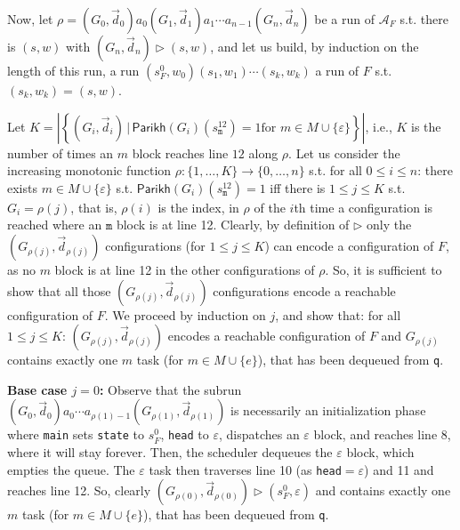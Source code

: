 \documentclass[runningheads,oribibl,]{article}
\newcommand{\set}[2]{\left\{#1\,\vert\,#2\right\}}
\newcommand{\Aa}{\ensuremath{\mathcal{A}}\xspace}
\newcommand{\e}{\ensuremath{\varepsilon}\xspace}
\newcommand{\Graph}{\ensuremath{G}}
\newcommand{\Data}{\ensuremath{\vec{d}}}
\newcommand{\Parikh}{\ensuremath{\mathsf{Parikh}}}
\newcommand{\mystate}[2]{\ensuremath{s^{#1}_{\mathtt{#2}}}}
\newenvironment{proof}{\noindent{\it Proof.\hspace*{.5cm}}}{}
\begin{document}
\begin{proof}
  Now, let $\rho=(\Graph_0,\Data_0)a_0(\Graph_1,\Data_1)a_1\cdots a_{n-1}
  (\Graph_n,\Data_n)$ be a run of $\Aa_F$ s.t. there is $(s,w)$ with
  $(\Graph_n,\Data_n)\rhd(s,w)$, and let us build, by induction on the
  length of this run, a run $(s^0_F,w_0)(s_1,w_1)\cdots(s_k,w_k)$ a
  run of $F$ s.t. $(s_k,w_k)=(s,w)$.

  Let
  $K=|\set{(\Graph_i,\Data_i)}{\Parikh(\Graph_i)(\mystate{12}{m})=1\textrm{
      for }m\in M\cup\{\e\}}|$, i.e., $K$ is the number of times an
  $m$ block reaches line $12$ along $\rho$. Let us consider the
  increasing monotonic function
  $\rho:\{1,\ldots,K\}\rightarrow\{0,\ldots,n\}$ s.t. for all $0\leq
  i\leq n$: there exists $m\in M\cup\{\e\}$
  s.t. $\Parikh(\Graph_i)(\mystate{12}{m})=1$ iff there is $1\leq
  j\leq K$ s.t. $\Graph_i=\rho(j)$, that is, $\rho(i)$ is the index,
  in $\rho$ of the $i$th time a configuration is reached where an
  $\mathtt{m}$ block is at line 12. Clearly, by definition of $\rhd$
  only the $(\Graph_{\rho(j)},\Data_{\rho(j)})$ configurations (for
  $1\leq j\leq K$) can encode a configuration of $F$, as no $m$ block
  is at line 12 in the other configurations of $\rho$. So, it is
  sufficient to show that all those
  $(\Graph_{\rho(j)},\Data_{\rho(j)})$ configurations encode a
  reachable configuration of $F$. We proceed by induction on $j$, and
  show that: for all $1\leq j\leq K$:
  $(\Graph_{\rho(j)},\Data_{\rho(j)})$ encodes a reachable
  configuration of $F$ and $\Graph_{\rho(j)}$ contains exactly one $m$
  task (for $m\in M\cup\{e\}$), that has been dequeued from
  \texttt{q}.

  \textbf{Base case $j=0$:} Observe that the subrun
  $(\Graph_0,\Data_0)a_0\cdots
  a_{\rho(1)-1}(\Graph_{\rho(1)},\Data_{\rho(1)})$ is necessarily an
  initialization phase where \texttt{main} sets \texttt{state} to
  $s_F^0$, \texttt{head} to $\e$, dispatches an $\e$ block, and
  reaches line 8, where it will stay forever. Then, the scheduler
  dequeues the $\e$ block, which empties the queue. The $\e$ task then
  traverses line 10 (as \texttt{head}$=\e$) and 11 and reaches line
  12. So, clearly $(\Graph_{\rho(0)},\Data_{\rho(0)})\rhd (s^0_F,\e)$
  and contains exactly one $m$ task (for $m\in M\cup\{e\}$), that has
  been dequeued from \texttt{q}.



\end{proof}
\end{document}
